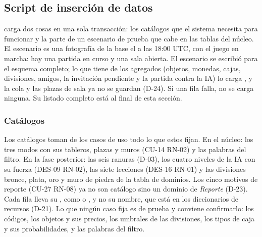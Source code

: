 \subsection*{Script de inserción de datos}

 carga dos cosas en una sola transacción: los catálogos que el sistema necesita para funcionar y la parte de un escenario de prueba que cabe en las \dpNumTablasConDatos{} tablas del núcleo. El escenario es una fotografía de la base el \dpFecha{} a las 18:00 UTC, con el juego en marcha: hay una partida en curso y una sala abierta. El escenario se escribió para el esquema completo; lo que tiene de los agregados (objetos, monedas, cajas, divisiones, amigos, la invitación pendiente y la partida contra la IA) lo carga , y la cola y las plazas de sala ya no se guardan (\mbox{D-24}). Si una fila falla, no se carga ninguna. Su listado completo está al final de esta sección.

\subsubsection*{Catálogos}

Los catálogos toman de los casos de uso todo lo que estos fijan. En el núcleo: los tres modos con sus tableros, plazas y muros (\mbox{CU-14} \mbox{RN-02}) y las palabras del filtro. En la fase posterior: las seis ranuras (\mbox{D-03}), los cuatro niveles de la IA con su fuerza (\mbox{DES-09} \mbox{RN-02}), las siete lecciones (\mbox{DES-16} \mbox{RN-01}) y las divisiones bronce, plata, oro y muro de piedra de la tabla de dominios. Los cinco motivos de reporte (\mbox{CU-27} \mbox{RN-08}) ya no son catálogo sino un dominio de \textit{Reporte} (\mbox{D-23}). Cada fila lleva su , como  o , y no su nombre, que está en los diccionarios de recursos (\mbox{D-21}). Lo que ningún caso fija es de prueba y conviene confirmarlo: los códigos, los objetos y sus precios, los umbrales de las divisiones, los tipos de caja y sus probabilidades, y las palabras del filtro.

